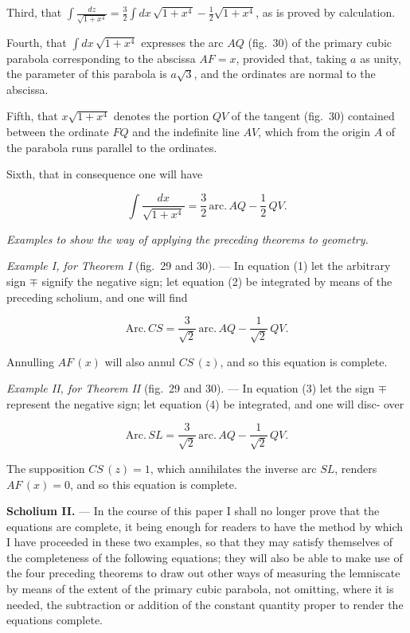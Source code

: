 \documentclass{article}
\begin{document}
Third, that $\displaystyle\int \frac{dz}{\sqrt{1+x^{4}}} = \frac{3}{2}\int dx\,\sqrt{1+x^{4}} -
\frac{1}{2}\sqrt{1+x^{4}}$, as is proved by calculation.

Fourth, that $\displaystyle\int dx\,\sqrt{1+x^{4}}$ expresses the arc $AQ$ (fig.~30) of the
primary cubic parabola corresponding to the abscissa $AF = x$, provided that, taking $a$ as
unity, the parameter of this parabola is $a\sqrt{3}$, and the ordinates are normal to the
abscissa.


Fifth, that $x\sqrt{1+x^{4}}$ denotes the portion $QV$ of the tangent (fig.~30) contained
between the ordinate $FQ$ and the indefinite line $AV$, which from the origin $A$ of the
parabola runs parallel to the ordinates.

Sixth, that in consequence one will have

\[ \int \frac{dx}{\sqrt{1+x^{4}}} = \frac{3}{2}\,\mathrm{arc.}\,AQ - \frac{1}{2}\,QV. \]

\emph{Examples to show the way of applying the preceding theorems to geometry.}

\emph{Example I, for Theorem I} (fig.~29 and 30). --- In equation (1) let the arbitrary sign
$\mp$ signify the negative sign; let equation (2) be integrated by means of the preceding
scholium, and one will find

\[ \mathrm{Arc.}\,CS = \frac{3}{\sqrt{2}}\,\mathrm{arc.}\,AQ - \frac{1}{\sqrt{2}}\,QV. \]

Annulling $AF\,(x)$ will also annul $CS\,(z)$, and so this equation is complete.

\emph{Example II, for Theorem II} (fig.~29 and 30). --- In equation (3) let the sign $\mp$
represent the negative sign; let equation (4) be integrated, and one will disc-
over

\[ \mathrm{Arc.}\,SL = \frac{3}{\sqrt{2}}\,\mathrm{arc.}\,AQ - \frac{1}{\sqrt{2}}\,QV. \]

The supposition $CS\,(z) = 1$, which annihilates the inverse arc $SL$, renders $AF\,(x) = 0$,
and so this equation is complete.

\textbf{Scholium II.} --- In the course of this paper I shall no longer prove that the equations
are complete, it being enough for readers to have the method by which I have proceeded in these
two examples, so that they may satisfy themselves of the completeness of the following
equations; they will also be able to make use of the four preceding theorems to draw out other
ways of measuring the lemniscate by means of the extent of the primary cubic parabola, not
omitting, where it is needed, the subtraction or addition of the constant quantity proper to
render the equations complete.
\end{document}
